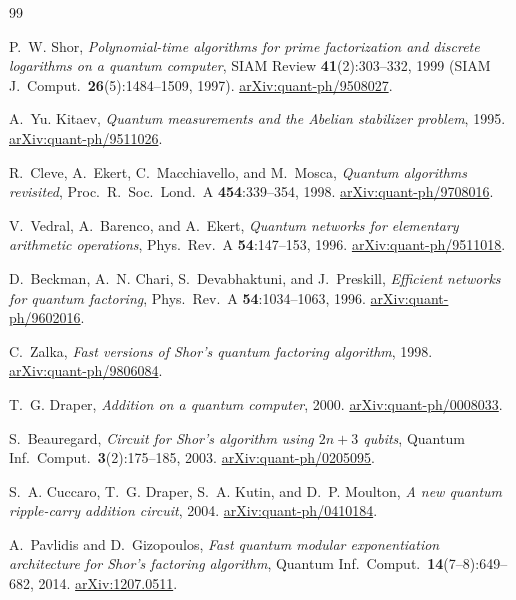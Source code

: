 \documentclass[11pt]{article}
\theoremstyle{plain}
\theoremstyle{remark}
\begin{document}


\begin{thebibliography}{99}\small

P.~W. Shor,
\emph{Polynomial-time algorithms for prime factorization and discrete logarithms on a quantum
computer}, SIAM Review \textbf{41}(2):303--332, 1999 (SIAM J.\ Comput.\ \textbf{26}(5):1484--1509,
1997). \href{https://arxiv.org/abs/quant-ph/9508027}{arXiv:quant-ph/9508027}.

A.~Yu. Kitaev,
\emph{Quantum measurements and the Abelian stabilizer problem},
1995. \href{https://arxiv.org/abs/quant-ph/9511026}{arXiv:quant-ph/9511026}.

R.~Cleve, A.~Ekert, C.~Macchiavello, and M.~Mosca,
\emph{Quantum algorithms revisited},
Proc.\ R.\ Soc.\ Lond.\ A \textbf{454}:339--354, 1998.
\href{https://arxiv.org/abs/quant-ph/9708016}{arXiv:quant-ph/9708016}.

V.~Vedral, A.~Barenco, and A.~Ekert,
\emph{Quantum networks for elementary arithmetic operations},
Phys.\ Rev.\ A \textbf{54}:147--153, 1996.
\href{https://arxiv.org/abs/quant-ph/9511018}{arXiv:quant-ph/9511018}.

D.~Beckman, A.~N. Chari, S.~Devabhaktuni, and J.~Preskill,
\emph{Efficient networks for quantum factoring},
Phys.\ Rev.\ A \textbf{54}:1034--1063, 1996.
\href{https://arxiv.org/abs/quant-ph/9602016}{arXiv:quant-ph/9602016}.

C.~Zalka,
\emph{Fast versions of Shor's quantum factoring algorithm},
1998. \href{https://arxiv.org/abs/quant-ph/9806084}{arXiv:quant-ph/9806084}.

T.~G. Draper,
\emph{Addition on a quantum computer},
2000. \href{https://arxiv.org/abs/quant-ph/0008033}{arXiv:quant-ph/0008033}.

S.~Beauregard,
\emph{Circuit for Shor's algorithm using $2n+3$ qubits},
Quantum Inf.\ Comput.\ \textbf{3}(2):175--185, 2003.
\href{https://arxiv.org/abs/quant-ph/0205095}{arXiv:quant-ph/0205095}.

S.~A. Cuccaro, T.~G. Draper, S.~A. Kutin, and D.~P. Moulton,
\emph{A new quantum ripple-carry addition circuit},
2004. \href{https://arxiv.org/abs/quant-ph/0410184}{arXiv:quant-ph/0410184}.

A.~Pavlidis and D.~Gizopoulos,
\emph{Fast quantum modular exponentiation architecture for Shor's factoring algorithm},
Quantum Inf.\ Comput.\ \textbf{14}(7--8):649--682, 2014.
\href{https://arxiv.org/abs/1207.0511}{arXiv:1207.0511}.


\end{thebibliography}
\end{document}
